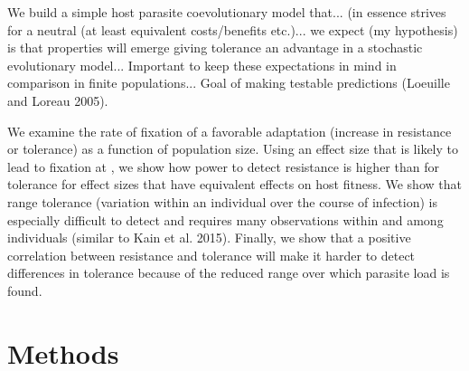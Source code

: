 We build a simple host parasite coevolutionary model that... (in essence strives for a neutral (at least equivalent costs/benefits etc.)... we expect (my hypothesis) is that properties will emerge giving tolerance an advantage in a stochastic evolutionary model... Important to keep these expectations in mind in comparison in finite populations... Goal of making testable predictions (Loeuille and Loreau 2005).

We examine  the rate of fixation of a favorable adaptation (increase in resistance or tolerance) as a function of population size. Using an effect size that is likely to lead to fixation at , we show how power to detect resistance is higher than for tolerance for effect sizes that have equivalent effects on host fitness. We show that range tolerance (variation within an individual over the course of infection) is especially difficult to detect and requires many observations within and among individuals (similar to Kain et al. 2015). Finally, we show that a positive correlation between resistance and tolerance will make it harder to detect differences in tolerance because of the reduced range over which parasite load is found. 

\section*{Methods}


